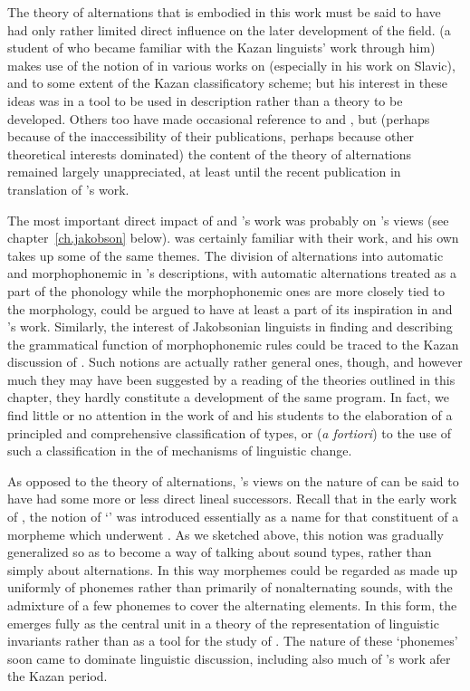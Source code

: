 The theory of alternations that is embodied in this work must be said
to have had only rather limited direct influence on the later
development of the field. {\Meillet} (a student of {\Saussure} who became
familiar with the Kazan linguists' work through him) makes use of the
notion of  in various works on  (especially in
his work on Slavic), and to some extent of the Kazan classificatory
scheme; but his interest in these ideas was in a tool to be used in
description rather than a theory to be developed. Others too have made
occasional reference to {\Baudouin} and {\Kruszewski}, but (perhaps because
of the inaccessibility of their publications, perhaps because other
theoretical interests dominated) the content of the theory of
alternations remained largely unappreciated, at least until the recent
publication in translation of {\Baudouin}'s work.

The most important direct impact of {\Baudouin} and {\Kruszewski}'s
work was probably on {\Jakobson}'s views (see chapter~\ref{ch.jakobson}
below). {\Jakobson} was certainly familiar with their work, and his own
takes up some of the same themes. The division of alternations into
automatic and morphophonemic in {\Jakobson}'s descriptions, with
automatic alternations treated as a part of the phonology while the
morphophonemic ones are more closely tied to the morphology, could be
argued to have at least a part of its inspiration in {\Kruszewski} and
{\Baudouin}'s work. Similarly, the interest of Jakobsonian linguists in
finding and describing the grammatical function of morphophonemic
rules could be traced to the Kazan discussion of . Such
notions are actually rather general ones, though, and however much
they may have been suggested by a reading of the theories outlined in
this chapter, they hardly constitute a development of the same
program. In fact, we find little or no attention in the work of
{\Jakobson} and his students to the elaboration of a principled and
comprehensive classification of  types, or (\emph{a
  fortiori}) to the use of such a classification in the  of
mechanisms of linguistic change.

As opposed to the theory of alternations, {\Baudouin}'s views on the
nature of  can be said to have had some more or less
direct lineal successors. Recall that in the early work of {\Kruszewski},
the notion of `' was introduced essentially as a name for that
constituent of a morpheme which underwent . As we sketched
above, this notion was gradually generalized so as to become a way of
talking about sound types, rather than simply about alternations. In
this way morphemes could be regarded as made up uniformly of phonemes
rather than primarily of nonalternating sounds, with the admixture of
a few phonemes to cover the alternating elements. In this form, the
 emerges fully as the central unit in a theory of the
representation of linguistic invariants rather than as a tool for the
study of . The nature of these `phonemes' soon came to
dominate linguistic discussion, including also much of {\Baudouin}'s work
afer the Kazan period.

